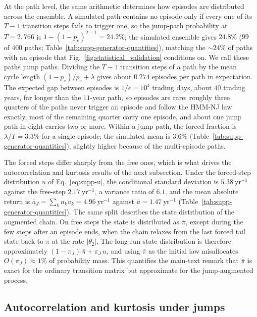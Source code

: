 At the path level, the same arithmetic determines how episodes are
distributed across the ensemble. A simulated path contains no episode
only if every one of its $T - 1$ transition steps fails to trigger
one, so the jump-path probability at $T = 2{,}766$ is
$1 - (1 - p_e)^{T-1} = 24.2\%$; the simulated ensemble
gives $24.8\%$ ($99$ of $400$ paths;
Table~\ref{tab:supp-generator-quantities}), matching the $\sim\!24\%$
of paths with an episode that
Fig.~\ref{fig:statistical_validation} conditions on. We call these
paths jump paths. Dividing the $T - 1$ transition steps of a path by
the mean cycle length $(1 - p_e)/p_e + \lambda$ gives about $0.274$
episodes per path in expectation. The expected gap between episodes
is $1/\epsilon = 10^4$ trading days, about $40$ trading years, far
longer than the $11$-year path, so episodes are rare: roughly three quarters of the paths never trigger an
episode and follow the HMM-NJ law exactly, most of the remaining
quarter carry one episode, and about one jump path in eight carries
two or more. Within a jump path, the forced fraction is
$\lambda / T = 3.3\%$ for a single episode; the simulated mean is
$3.6\%$ (Table~\ref{tab:supp-generator-quantities}), slightly higher
because of the multi-episode paths.

The forced steps differ sharply from the free ones, which is what
drives the autocorrelation and kurtosis results of the next
subsection. Under the forced-step distribution $u$ of
Eq.~\eqref{eq:supp-u}, the conditional standard deviation is
$5.38~\mathrm{yr}^{-1}$ against the free-step $2.17~\mathrm{yr}^{-1}$,
a variance ratio of $6.1$, and the mean absolute return is
$\bar a_J = \sum_k u_k a_k = 4.96~\mathrm{yr}^{-1}$ against
$\bar a = 1.47~\mathrm{yr}^{-1}$
(Table~\ref{tab:supp-generator-quantities}). The same split describes
the state distribution of the augmented chain. On free steps the state
is distributed as $\bar\pi$, except during the few steps after an
episode ends, when the chain relaxes from the last forced tail state
back to $\bar\pi$ at the rate $|\theta_2|$. The long-run state
distribution is therefore approximately $(1 - \pi_J)\,\bar\pi +
\pi_J\, u$, and using $\bar\pi$ as the initial law misallocates
$O(\pi_J) \approx 1\%$ of probability mass. This quantifies the
main-text remark that $\bar\pi$ is exact for the ordinary transition
matrix but approximate for the jump-augmented process.

\subsection{Autocorrelation and kurtosis under jumps}
\label{sec:supp-gen-tuning}

